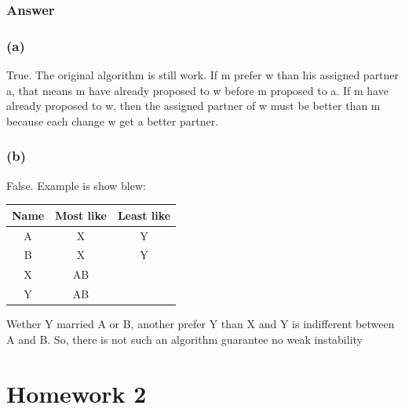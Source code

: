 \documentclass[a4paper]{article}
\begin{document}
\subsubsection*{Answer}
\subsubsection*{(a)}
True. The original algorithm is still work. If m prefer w than his assigned partner a, that means m have already proposed to w before m proposed to a. If m have already proposed to w, then the assigned partner of w must be better than m because each change w get a better partner.
\subsubsection*{(b)}
False. Example is show blew:
\begin{center}
	\begin{tabular}{|c|c|c|}
		\hline
		Name & Most like & Least like \\
		\hline
		A    & X         & Y          \\
		\hline
		B    & X         & Y          \\
		\hline
		X    & AB        &            \\
		\hline
		Y    & AB        &            \\
		\hline
	\end{tabular}
\end{center}
\par Wether Y married A or B, another prefer Y than X and Y is indifferent
between A and B. So, there is not such an algorithm guarantee no weak instability

\newpage
\section*{Homework 2}
\end{document}
